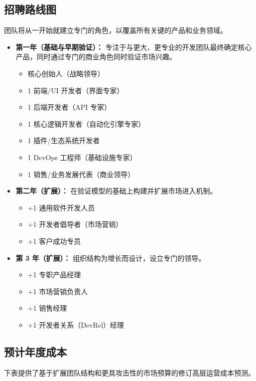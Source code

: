 \documentclass[11pt, a4paper, oneside]{article}
\begin{document}
\subsection*{招聘路线图}
团队将从一开始就建立专门的角色，以覆盖所有关键的产品和业务领域。
\begin{itemize}
    \item \textbf{第一年（基础与早期验证）：} 专注于与更大、更专业的开发团队最终确定核心产品，同时通过专门的商业角色同时验证市场兴趣。
    \begin{itemize}
        \item 核心创始人（战略领导）
        \item 1 前端/UI 开发者（界面专家）
        \item 1 后端开发者（API 专家）
        \item 1 核心逻辑开发者（自动化引擎专家）
        \item 1 插件/生态系统开发者
        \item 1 DevOps 工程师（基础设施专家）
        \item 1 销售/业务发展代表（商业领导）
    \end{itemize}
    \item \textbf{第二年（扩展）：} 在验证模型的基础上构建并扩展市场进入机制。



\begin{itemize}
    \item +1 通用软件开发人员
    \item +1 开发者倡导者（市场营销）
    \item +1 客户成功专员
\end{itemize}
\item \textbf{第 3 年（扩展）：} 组织结构为增长而设计，设立专门的领导。
\begin{itemize}
    \item +1 专职产品经理
    \item +1 市场营销负责人
    \item +1 销售经理
    \item +1 开发者关系（DevRel）经理
\end{itemize}
\end{itemize}

\subsection*{预计年度成本}
下表提供了基于扩展团队结构和更具攻击性的市场预算的修订高层运营成本预测。
\end{document}
